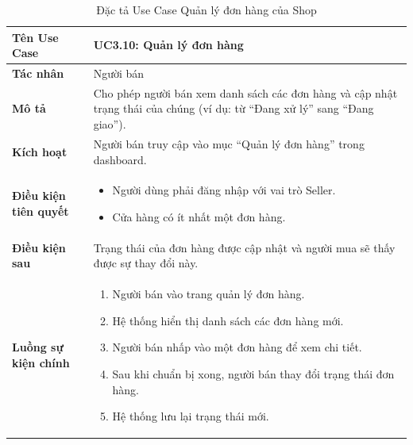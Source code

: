 \begin{table}[H]
\centering
\begin{tabularx}{\textwidth}{|l|X|}
\hline
\textbf{Tên Use Case} & \textbf{UC3.10: Quản lý đơn hàng} \\ \hline
\textbf{Tác nhân} & Người bán \\ \hline
\textbf{Mô tả} & Cho phép người bán xem danh sách các đơn hàng và cập nhật trạng thái của chúng (ví dụ: từ ``Đang xử lý'' sang ``Đang giao''). \\ \hline
\textbf{Kích hoạt} & Người bán truy cập vào mục ``Quản lý đơn hàng'' trong dashboard. \\ \hline
\textbf{Điều kiện tiên quyết} & 
\begin{itemize}
    \item Người dùng phải đăng nhập với vai trò Seller.
    \item Cửa hàng có ít nhất một đơn hàng.
\end{itemize} \\ \hline
\textbf{Điều kiện sau} & Trạng thái của đơn hàng được cập nhật và người mua sẽ thấy được sự thay đổi này. \\ \hline
\textbf{Luồng sự kiện chính} & 
\begin{enumerate}
    \item Người bán vào trang quản lý đơn hàng.
    \item Hệ thống hiển thị danh sách các đơn hàng mới.
    \item Người bán nhấp vào một đơn hàng để xem chi tiết.
    \item Sau khi chuẩn bị xong, người bán thay đổi trạng thái đơn hàng.
    \item Hệ thống lưu lại trạng thái mới.
\end{enumerate} \\ \hline
\end{tabularx}
\caption{Đặc tả Use Case Quản lý đơn hàng của Shop}
\end{table}

